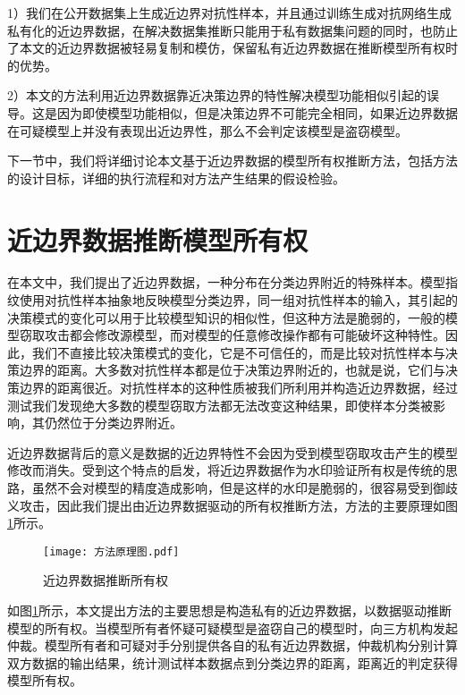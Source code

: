 1）我们在公开数据集上生成近边界对抗性样本，并且通过训练生成对抗网络生成私有化的近边界数据，在解决数据集推断只能用于私有数据集问题的同时，也防止了本文的近边界数据被轻易复制和模仿，保留私有近边界数据在推断模型所有权时的优势。

2）本文的方法利用近边界数据靠近决策边界的特性解决模型功能相似引起的误导。这是因为即使模型功能相似，但是决策边界不可能完全相同，如果近边界数据在可疑模型上并没有表现出近边界性，那么不会判定该模型是盗窃模型。

下一节中，我们将详细讨论本文基于近边界数据的模型所有权推断方法，包括方法的设计目标，详细的执行流程和对方法产生结果的假设检验。

\section{近边界数据推断模型所有权}\label{4.2}

在本文中，我们提出了近边界数据，一种分布在分类边界附近的特殊样本。模型指纹\cite{cao2021ipguard}使用对抗性样本抽象地反映模型分类边界，同一组对抗性样本的输入，其引起的决策模式的变化可以用于比较模型知识的相似性，但这种方法是脆弱的，一般的模型窃取攻击都会修改源模型，而对模型的任意修改操作都有可能破坏这种特性。因此，我们不直接比较决策模式的变化，它是不可信任的，而是比较对抗性样本与决策边界的距离。大多数对抗性样本都是位于决策边界附近的，也就是说，它们与决策边界的距离很近。对抗性样本的这种性质被我们所利用并构造近边界数据，经过测试我们发现绝大多数的模型窃取方法都无法改变这种结果，即使样本分类被影响，其仍然位于分类边界附近。

近边界数据背后的意义是数据的近边界特性不会因为受到模型窃取攻击产生的模型修改而消失。受到这个特点的启发，将近边界数据作为水印验证所有权是传统的思路，虽然不会对模型的精度造成影响，但是这样的水印是脆弱的，很容易受到御歧义攻击，因此我们提出由近边界数据驱动的所有权推断方法，方法的主要原理如图\ref{方法原理图}所示。

\begin{figure}[htbp]%
	\centering
	\setlength{\abovecaptionskip}{5mm} %
	\setlength{\belowcaptionskip}{-3mm} %
	\texttt{[image: 方法原理图.pdf]}
	\caption{近边界数据推断所有权}
	\label{方法原理图}
	\end {figure}
	
如图\ref{方法原理图}所示，本文提出方法的主要思想是构造私有的近边界数据，以数据驱动推断模型的所有权。当模型所有者怀疑可疑模型是盗窃自己的模型时，向三方机构发起仲裁。模型所有者和可疑对手分别提供各自的私有近边界数据，仲裁机构分别计算双方数据的输出结果，统计测试样本数据点到分类边界的距离，距离近的判定获得模型所有权。

